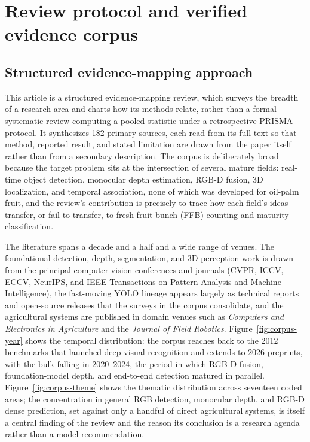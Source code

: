 \section{Review protocol and verified evidence corpus}

\subsection{Structured evidence-mapping approach}

This article is a structured evidence-mapping review, which surveys the breadth of a research area and charts how its methods relate, rather than a formal systematic review computing a pooled statistic under a retrospective PRISMA protocol. It synthesizes 182 primary sources, each read from its full text so that method, reported result, and stated limitation are drawn from the paper itself rather than from a secondary description. The corpus is deliberately broad because the target problem sits at the intersection of several mature fields: real-time object detection, monocular depth estimation, RGB-D fusion, 3D localization, and temporal association, none of which was developed for oil-palm fruit, and the review's contribution is precisely to trace how each field's ideas transfer, or fail to transfer, to fresh-fruit-bunch (FFB) counting and maturity classification.

The literature spans a decade and a half and a wide range of venues. The foundational detection, depth, segmentation, and 3D-perception work is drawn from the principal computer-vision conferences and journals (CVPR, ICCV, ECCV, NeurIPS, and IEEE Transactions on Pattern Analysis and Machine Intelligence), the fast-moving YOLO lineage appears largely as technical reports and open-source releases that the surveys in the corpus consolidate, and the agricultural systems are published in domain venues such as \emph{Computers and Electronics in Agriculture} and the \emph{Journal of Field Robotics}. Figure~\ref{fig:corpus-year} shows the temporal distribution: the corpus reaches back to the 2012 benchmarks that launched deep visual recognition and extends to 2026 preprints, with the bulk falling in 2020--2024, the period in which RGB-D fusion, foundation-model depth, and end-to-end detection matured in parallel. Figure~\ref{fig:corpus-theme} shows the thematic distribution across seventeen coded areas; the concentration in general RGB detection, monocular depth, and RGB-D dense prediction, set against only a handful of direct agricultural systems, is itself a central finding of the review and the reason its conclusion is a research agenda rather than a model recommendation.

